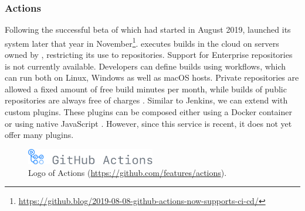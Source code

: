 
\subsubsection{\github{} Actions}\label{sssec:github-actions}
Following the successful beta of \githubactions{} which had started in August 2019, \github launched its \CI{} system later that year in November\footnote{\url{https://github.blog/2019-08-08-github-actions-now-supports-ci-cd/}}. \githubactions{} executes builds in the cloud on servers owned by \github{}, restricting its use to \github{} repositories. Support for \github{} Enterprise repositories is not currently available. Developers can define builds using workflows, which can run both on Linux, Windows as well as macOS hosts. Private repositories are allowed a fixed amount of free build minutes per month, while builds of public repositories are always free of charges  \cite{githubactions}. Similar to Jenkins, we can extend \githubactions{} with custom plugins. These plugins can be composed either using a Docker container or using native JavaScript \cite{aboutgithubactions}. However, since this service is recent, it does not yet offer many plugins.

\begin{figure}[htbp!]
	\centering
	\includegraphics[width=0.5\textwidth]{assets/images/github-actions.pdf}
	\caption{Logo of \github{} Actions (\url{https://github.com/features/actions}).}
	\label{fig:github-actions}
\end{figure}